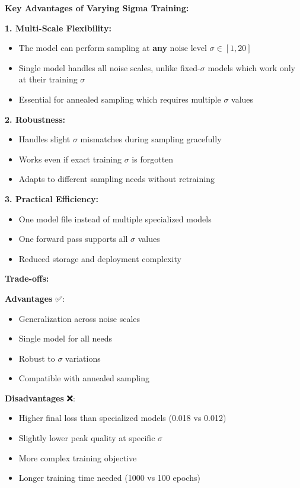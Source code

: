 \documentclass[12pt,a4paper]{article}
\begin{document}
\textbf{Key Advantages of Varying Sigma Training:}

\textbf{1. Multi-Scale Flexibility:}
\begin{itemize}
    \item The model can perform sampling at \textbf{any} noise level $\sigma \in [1, 20]$
    \item Single model handles all noise scales, unlike fixed-$\sigma$ models which work only at their training $\sigma$
    \item Essential for annealed sampling which requires multiple $\sigma$ values
\end{itemize}

\textbf{2. Robustness:}
\begin{itemize}
    \item Handles slight $\sigma$ mismatches during sampling gracefully
    \item Works even if exact training $\sigma$ is forgotten
    \item Adapts to different sampling needs without retraining
\end{itemize}

\textbf{3. Practical Efficiency:}
\begin{itemize}
    \item One model file instead of multiple specialized models
    \item One forward pass supports all $\sigma$ values
    \item Reduced storage and deployment complexity
\end{itemize}

\textbf{Trade-offs:}

\textbf{Advantages} ✅:
\begin{itemize}
    \item Generalization across noise scales
    \item Single model for all needs
    \item Robust to $\sigma$ variations
    \item Compatible with annealed sampling
\end{itemize}

\textbf{Disadvantages} ❌:
\begin{itemize}
    \item Higher final loss than specialized models (0.018 vs 0.012)
    \item Slightly lower peak quality at specific $\sigma$
    \item More complex training objective
    \item Longer training time needed (1000 vs 100 epochs)
\end{itemize}
\end{document}
